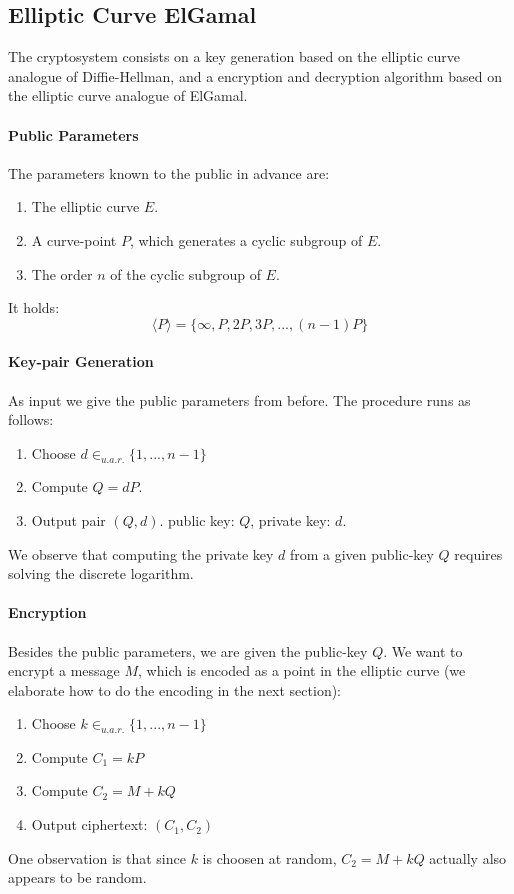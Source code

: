 \documentclass[11pt,english]{article}
\begin{document}
\subsection{Elliptic Curve ElGamal}
The cryptosystem consists on a key generation based on the elliptic curve analogue of Diffie-Hellman, and a encryption and decryption algorithm based on the elliptic curve analogue of ElGamal.

\paragraph{Public Parameters} The parameters known to the public in advance are:
\begin{enumerate}
 \item The elliptic curve $E$.
 \item A curve-point $P$, which generates a cyclic subgroup of $E$.
 \item The order $n$ of the cyclic subgroup of $E$.
\end{enumerate}
It holds:
\begin{displaymath}
 \langle P\rangle=\{\infty,P,2P,3P,...,(n-1)P\}
\end{displaymath}


\paragraph{Key-pair Generation}
As input we give the public parameters from before. The procedure runs as follows:
\begin{enumerate}
 \item Choose $d\in_{u.a.r.}\{1,...,n-1\}$
 \item Compute $Q=dP$.
 \item Output pair $(Q,d)$. public key: $Q$, private key: $d$.
\end{enumerate}
We observe that computing the private key $d$ from a given public-key $Q$ requires solving the discrete logarithm.

\paragraph{Encryption}
Besides the public parameters, we are given the public-key $Q$. We want to encrypt a message $M$, which is encoded as a point in the elliptic curve (we elaborate how to do the encoding in the next section):
\begin{enumerate}
\item Choose $k\in_{u.a.r.}\{1,...,n-1\}$
\item Compute $C_1=kP$
\item Compute $C_2=M+kQ$
\item Output ciphertext: $(C_1,C_2)$
\end{enumerate}
One observation is that since $k$ is choosen at random, $C_2=M+kQ$ actually also appears to be random.
\end{document}

